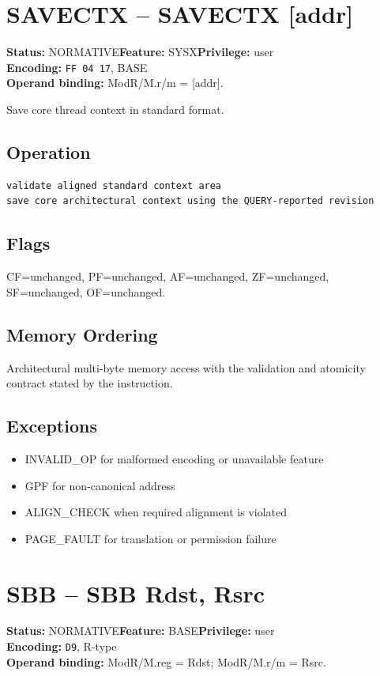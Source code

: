 \documentclass[10pt]{article}
\begin{document}
\section{SAVECTX -- SAVECTX [addr]}
\textbf{Status:} NORMATIVE\quad \textbf{Feature:} SYSX\quad \textbf{Privilege:} user\\
\textbf{Encoding:} \texttt{FF 04 17}, BASE\\
\textbf{Operand binding:} ModR/M.r/m = [addr].

Save core thread context in standard format.

\subsection*{Operation}
\begin{lstlisting}
validate aligned standard context area
save core architectural context using the QUERY-reported revision
\end{lstlisting}
\subsection*{Flags}
CF=unchanged, PF=unchanged, AF=unchanged, ZF=unchanged, SF=unchanged, OF=unchanged.
\subsection*{Memory Ordering}
Architectural multi-byte memory access with the validation and atomicity contract stated by the instruction.
\subsection*{Exceptions}
\begin{itemize}
\item INVALID\_OP for malformed encoding or unavailable feature
\item GPF for non-canonical address
\item ALIGN\_CHECK when required alignment is violated
\item PAGE\_FAULT for translation or permission failure
\end{itemize}
\clearpage

\section{SBB -- SBB Rdst, Rsrc}
\textbf{Status:} NORMATIVE\quad \textbf{Feature:} BASE\quad \textbf{Privilege:} user\\
\textbf{Encoding:} \texttt{D9}, R-type\\
\textbf{Operand binding:} ModR/M.reg = Rdst; ModR/M.r/m = Rsrc.
\end{document}
